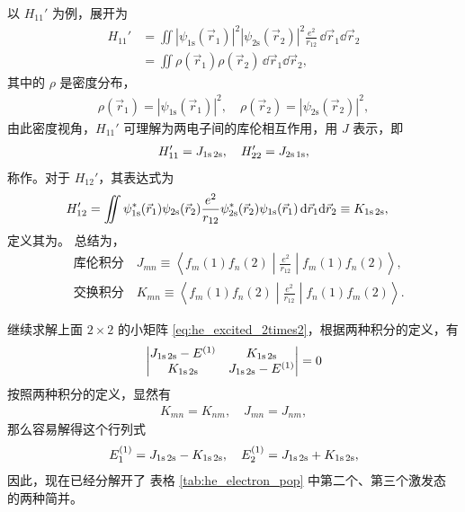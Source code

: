 以 $H_{11}'$ 为例，展开为
\begin{align}
    H_{11}' &= \iint |\psi_{\text{1s}}(\vec r_1)|^2 |\psi_{\text{2s}}(\vec r_2)|^2 \frac{e^2}{r_{12}} \,\dd\vec r_1 \dd\vec r_2 \\
    & = \iint \rho(\vec r_1) \rho(\vec r_2) \,\dd\vec r_1 \dd\vec r_2,
\end{align}
其中的 $\rho$ 是密度分布，
\begin{align}
    \rho(\vec r_1) = |\psi_{\text{1s}}(\vec r_1)|^2,
    \quad 
    \rho(\vec r_2) = |\psi_{\text{2s}}(\vec r_2)|^2,
\end{align}
由此密度视角，$H_{11}'$ 可理解为两电子间的库伦相互作用，用 $J$ 表示，即
\begin{align}
    H'_{11} = J_{\text{1s\,2s}}, \quad H_{22}' = J_{\text{2s\,1s}},
\end{align}
称作。对于 $H_{12}'$，其表达式为
\begin{align}
H_{12}' &= \iint \psi_{\text{1s}}^*(\vec r_1) \psi_{\text{2s}} (\vec r_2) \frac{e^2}{r_{12}} \psi_{\text{2s}}^*(\vec r_2) \psi_{\text{1s}} (\vec r_1) \,\mathrm{d}\vec r_1 \mathrm{d}\vec r_2 \equiv K_{\text{1s\,2s}},
\end{align}
定义其为。
总结为，
\begin{align}
&\text{库伦积分}\quad 
J_{mn} \equiv \left\langle f_m(1) f_n(2) \middle| \frac{e^2}{r_{12}} \middle| f_m(1)f_n(2) \right\rangle, \\
&\text{交换积分}\quad K_{mn} \equiv \left\langle f_m(1) f_n(2) \middle| \frac{e^2}{r_{12}} \middle| f_n(1)f_m(2) \right\rangle. 
\end{align}

继续求解上面 $2\times2$ 的小矩阵 \eqref{eq:he_excited_2times2}，根据两种积分的定义，有
\begin{align}
    \left|\begin{matrix}
        J_{\text{1s\,2s}} - E^{(1)} & K_{\text{1s\,2s}} \\
        K_{\text{1s\,2s}} & J_{\text{1s\,2s}} - E^{(1)}
    \end{matrix}\right| = 0
\end{align}
按照两种积分的定义，显然有
\begin{align}
    K_{mn} = K_{nm}, \quad J_{mn} = J_{nm},
\end{align}
那么容易解得这个行列式
\begin{align}
E_1^{(1)} = J_{\text{1s\,2s}} - K_{\text{1s\,2s}}, \quad E_2^{(1)} = J_{\text{1s\,2s}} + K_{\text{1s\,2s}},
\end{align}
因此，现在已经分解开了
表格 \ref{tab:he_electron_pop} 中第二个、第三个激发态
的两种简并。

